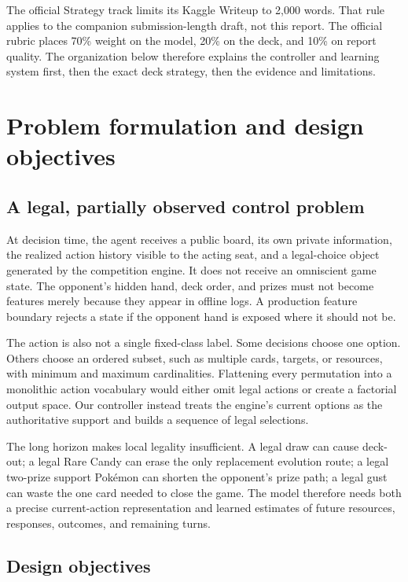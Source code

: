 \documentclass[10pt]{article}
\begin{document}
The official Strategy track limits its Kaggle Writeup to 2,000 words. That rule applies to the companion submission-length draft, not this report. The official rubric places 70\% weight on the model, 20\% on the deck, and 10\% on report quality. The organization below therefore explains the controller and learning system first, then the exact deck strategy, then the evidence and limitations.

\section{Problem formulation and design objectives}

\subsection{A legal, partially observed control problem}

At decision time, the agent receives a public board, its own private information, the realized action history visible to the acting seat, and a legal-choice object generated by the competition engine. It does not receive an omniscient game state. The opponent's hidden hand, deck order, and prizes must not become features merely because they appear in offline logs. A production feature boundary rejects a state if the opponent hand is exposed where it should not be.

The action is also not a single fixed-class label. Some decisions choose one option. Others choose an ordered subset, such as multiple cards, targets, or resources, with minimum and maximum cardinalities. Flattening every permutation into a monolithic action vocabulary would either omit legal actions or create a factorial output space. Our controller instead treats the engine's current options as the authoritative support and builds a sequence of legal selections.

The long horizon makes local legality insufficient. A legal draw can cause deck-out; a legal Rare Candy can erase the only replacement evolution route; a legal two-prize support Pok\'emon can shorten the opponent's prize path; a legal gust can waste the one card needed to close the game. The model therefore needs both a precise current-action representation and learned estimates of future resources, responses, outcomes, and remaining turns.

\subsection{Design objectives}
\end{document}
